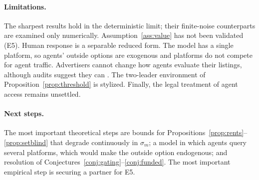\documentclass[opre,dblanonrev]{informs4}
\providecommand{\1}{\mathbf{1}}
\begin{document}
\paragraph{Limitations.} The sharpest results hold in the deterministic limit; their finite-noise counterparts are examined only numerically. Assumption~\ref{ass:value} has not been validated (E5). Human response is a separable reduced form. The model has a single platform, so agents' outside options are exogenous and platforms do not compete for agent traffic. Advertisers cannot change how agents evaluate their listings, although audits suggest they can \citep{allouah2026your}. The two-leader environment of Proposition~\ref{prop:threshold} is stylized. Finally, the legal treatment of agent access remains unsettled.

\paragraph{Next steps.} The most important theoretical steps are bounds for Propositions~\ref{prop:rents}--\ref{prop:setblind} that degrade continuously in $\sigma_m$; a model in which agents query several platforms, which would make the outside option endogenous; and resolution of Conjectures~\ref{conj:gating}--\ref{conj:funded}. The most important empirical step is securing a partner for E5.
\end{document}
